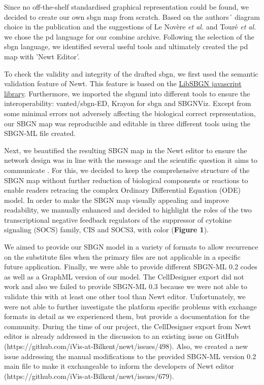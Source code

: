 Since no off-the-shelf standardised graphical representation could be found, we decided to create our own \ac{sbgn} map from scratch. Based on the authors´ diagram choice in the publication and the suggestions of Le Novère \textit{et al.} \cite{sbgnnovere} and Touré \textit{et al.} \cite{sbgntoure} we chose the \ac{pd} language for our \ac{combine} archive. Following the selection of the \ac{sbgn} language, we identified several useful tools and ultimately created the \ac{pd} map with 'Newt Editor'. 

To check the validity and integrity of the drafted \ac{sbgn}, we first used the semantic validation feature of Newt. This feature is based on the \hyperref[https://github.com/sbgn/libsbgn]{LibSBGN javascript library}\cite{van2012software}. Furthermore, we imported the \ac{sbgnml} into different tools to ensure the interoperability: \acs{vanted}/\acs{sbgn}-ED, Krayon for \ac{sbgn} and SBGNViz. Except from some minimal errors not adversely affecting the biological correct representation, our SBGN map was reproducible and editable in three different tools using the SBGN-ML file created.

Next, we beautified the resulting SBGN map in the Newt editor to ensure the network design was in line with the message and the scientific question it aims to communicate \cite{sbgntoure}.  For this, we decided to keep the comprehensive structure of the SBGN map without further reduction of biological components or reactions to enable readers retracing the complex Ordinary Differential Equation (ODE) model. In order to make the SBGN map visually appealing and improve readability, we manually enhanced and decided to highlight the roles of the two transcriptional negative feedback regulators of the suppressor of cytokine signaling (SOCS) family, CIS and SOCS3, with color (\textbf{Figure 1}). 

We aimed to provide our SBGN model in a variety of formats to allow recurrence on the substitute files when the primary files are not applicable in a specific future application. Finally, we were able to provide different SBGN-ML 0.2 codes as well as a GraphML version of our model. The CellDesigner export did not work and also we failed to provide SBGN-ML 0.3 because we were not able to validate this with at least one other tool than Newt editor. Unfortunately, we were not able to further investigate the platform specific problems with exchange formats in detail as we experienced them, but provide a documentation for the community. During the time of our project, the CellDesigner export from Newt editor is already addressed in the discussion to an existing issue on GitHub (https://github.com/iVis-at-Bilkent/newt/issues/498). Also, we created a new issue addressing the manual modifications to the provided SBGN-ML version 0.2 main file to make it exchangeable to inform the developers of Newt editor (https://github.com/iVis-at-Bilkent/newt/issues/679).

